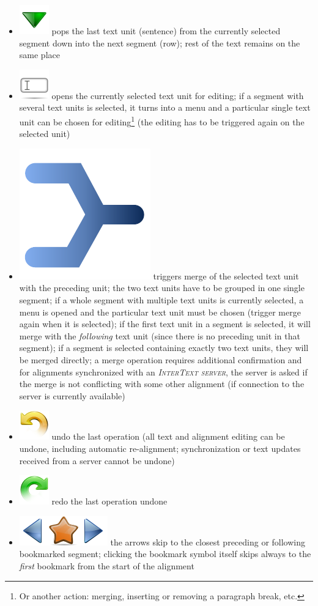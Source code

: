 \documentclass[a4paper,10pt,oneside]{book}
\newcommand{\ITserver}{\textit{\textsc{InterText server}}\xspace}
\begin{document}
\begin{itemize}
	\item \includegraphics[height=2ex]{../images/48/arrow-down.png} pops the last text unit (sentence) from the currently selected segment down into the next segment (row); rest of the text remains on the same place
	\item \includegraphics[height=2ex]{../images/48/edit-rename.png} opens the currently selected text unit for editing; if a segment with several text units is selected, it turns into a menu and a particular single text unit can be chosen for editing\footnote{Or another action: merging, inserting or removing a paragraph break, etc.} (the editing has to be triggered again on the selected unit)
	\item \includegraphics[height=2ex]{merge.pdf} triggers merge of the selected text unit with the preceding unit; the two text units have to be grouped in one single segment; if a whole segment with multiple text units is currently selected, a menu is opened and the particular text unit must be chosen (trigger merge again when it is selected); if the first text unit in a segment is selected, it will merge with the \emph{following} text unit (since there is no preceding unit in that segment); if a segment is selected containing exactly two text units, they will be merged directly; a merge operation requires additional confirmation and for alignments synchronized with an \ITserver, the server is asked if the merge is not conflicting with some other alignment (if connection to the server is currently available)
	\item \includegraphics[height=2ex]{../images/48/edit-undo.png} undo the last operation (all text and alignment editing can be undone, including automatic re-alignment; synchronization or text updates received from a server cannot be undone)
	\item \includegraphics[height=2ex]{../images/48/edit-redo.png} redo the last operation undone
	\item \includegraphics[height=2ex]{../images/48/go-previous-view.png}\includegraphics[height=2ex]{../images/48/mark.png}\includegraphics[height=2ex]{../images/48/go-next-view.png} the arrows skip to the closest preceding or following bookmarked segment; clicking the bookmark symbol itself skips always to the \emph{first} bookmark from the start of the alignment

\end{itemize}
\end{document}
